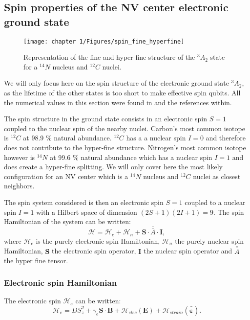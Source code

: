 \documentclass[a4paper,11pt]{report}
\begin{document}
\begin{refsection}
\subsection{Spin properties of the NV center electronic ground state}
\begin{figure}[h!]
\centering
\texttt{[image: chapter 1/Figures/spin\_fine\_hyperfine]}
\caption{Representation of the fine and hyper-fine structure of the $^3A_2$ state for a $^{14}N$ nucleus and $^{12}C$ nuclei.}
\label{NV spin}
\end{figure}

We will only focus here on the spin structure of the electronic ground state $^3A_2$, as the lifetime of the other states is too short to make effective spin qubits. All the numerical values in this section were found in \citep{smeltzer2009robust, doherty2013nitrogen} and the references within.

The spin structure in the ground state consists in an electronic spin $S=1$ coupled to the nuclear spin of the nearby nuclei. Carbon's most common isotope is $^{12}C$ at 98.9 \% natural abundance. $^{12}C$ has a a nuclear spin $I=0$ and therefore does not contribute to the hyper-fine structure. Nitrogen's most common isotope however is $^{14}N$ at 99.6 \% natural abundance which has a nuclear spin $I=1$ and does create a hyper-fine splitting. We will only cover here the most likely configuration for an NV center which is a $^{14}N$ nucleus and $^{12}C$ nuclei as closest neighbors. 

The spin system considered is then an electronic spin $S=1$ coupled to a nuclear spin $I=1$ with a Hilbert space of dimension $(2S+1)(2I+1)=9$. The spin Hamiltonian of the system can be written:
\begin{equation}
\mathcal{H}=\mathcal{H}_e + \mathcal{H}_n + \mathbf{S}\cdot \bar{\bar{A}}\cdot \mathbf{I},
\end{equation}
where $\mathcal{H}_e$ is the purely electronic spin Hamiltonian, $\mathcal{H}_n$ the purely nuclear spin Hamiltonian, $\mathbf{S}$ the electronic spin operator, $\mathbf{I}$ the nuclear spin operator and $\bar{\bar{A}}$ the hyper fine tensor.
\subsubsection{Electronic spin Hamiltonian}
The electronic spin $\mathcal{H}_e$ can be written:
\begin{equation}
\label{eq. spin elec}
\mathcal{H}_e=D S_z^2 + \gamma_e \mathbf{S} \cdot \mathbf{B} + \mathcal{H}_{elec}(\mathbf{E})+ \mathcal{H}_{strain}(\mathbf{\bar{\bar{\varepsilon}}}).
\end{equation}


\end{refsection}
\end{document}
